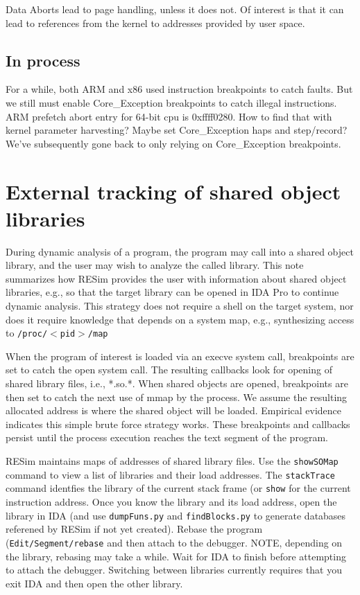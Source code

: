 \documentclass[titlepage]{article}
\begin{document}
\begin{appendices}
Data Aborts lead to page handling, unless it does not.  Of interest is that it can lead to references from the kernel to addresses provided by user space.

\subsection{In process}
For a while, both ARM and x86 used instruction breakpoints to catch faults.  But we still must enable Core\_Exception breakpoints to catch illegal instructions.
ARM prefetch abort entry for 64-bit cpu is 0xffff0280.  How to find that with kernel parameter harvesting?  Maybe set Core\_Exception haps and step/record?
We've subsequently gone back to only relying on Core\_Exception breakpoints.

\section{External tracking of shared object libraries}
\label{shared-libraries}
During dynamic analysis of a program, the program may call into a shared object library, and the user may wish to analyze the called library.  This note summarizes how RESim provides the user with information about shared object libraries, e.g., so that the target library can be opened in IDA Pro to continue dynamic analysis.  This strategy does not require a shell on the target system, nor does it require knowledge that depends on a system map, e.g., 
synthesizing access to {\tt /proc/$<$pid$>$/map}

When the program of interest is loaded via an execve system call, breakpoints are set to catch the open system call.  The resulting callbacks look for opening of shared library files, i.e., *.so.*.   When shared objects are opened, breakpoints are then set to catch the next use of mmap by the process.  We assume the resulting allocated address is where the shared object will be loaded.  Empirical evidence indicates this simple brute force strategy works.  These breakpoints and callbacks persist until the process execution reaches the text segment of the program.

RESim maintains maps of addresses of shared library files.  Use the {\tt showSOMap} command to view a list of libraries and their load
addresses.  The {\tt stackTrace} command identfies the library of the current stack frame (or {\tt show} for the current instruction address.
Once you know the library and its load address, open the library in IDA (and use {\tt dumpFuns.py} and {\tt findBlocks.py} to generate databases
referened by RESim if not yet created). Rebase the program ({\tt Edit/Segment/rebase} and then attach to the debugger. NOTE, depending on the library, rebasing may take a while.
Wait for IDA to finish before attempting to attach the debugger.
Switching between libraries currently requires that you exit IDA and then open the other library.


\end{appendices}
\end{document}
